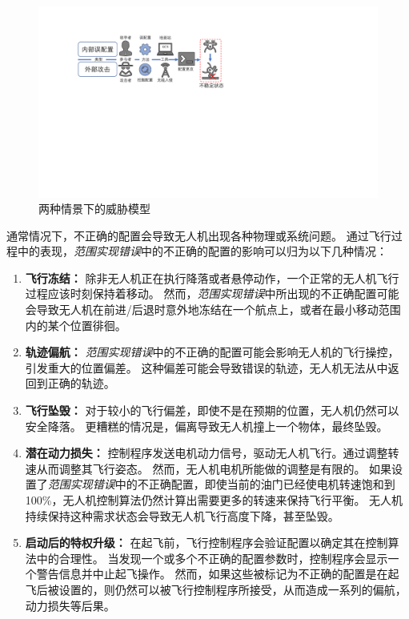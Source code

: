 \begin{figure}[ht]
  \centering
    \includegraphics[width=0.9\columnwidth]{fig/background/attack.pdf}
\caption{两种情景下的威胁模型}
\label{fig:range_attack}  
\end{figure}


通常情况下，不正确的配置会导致无人机出现各种物理或系统问题。
通过飞行过程中的表现，\textit{范围实现错误}中的不正确的配置的影响可以归为以下几种情况：
\begin{enumerate}
    \item \textbf{飞行冻结：} 除非无人机正在执行降落或者悬停动作，一个正常的无人机飞行过程应该时刻保持着移动。
    然而，\textit{范围实现错误}中所出现的不正确配置可能会导致无人机在前进/后退时意外地冻结在一个航点上，或者在最小移动范围内的某个位置徘徊。
    
    \item \textbf{轨迹偏航：} \textit{范围实现错误}中的不正确的配置可能会影响无人机的飞行操控，引发重大的位置偏差。  
    这种偏差可能会导致错误的轨迹，无人机无法从中返回到正确的轨迹。
    
    \item \textbf{飞行坠毁：} 对于较小的飞行偏差，即使不是在预期的位置，无人机仍然可以安全降落。
    更糟糕的情况是，偏离导致无人机撞上一个物体，最终坠毁。

    \item \textbf{潜在动力损失：} 控制程序发送电机动力信号，驱动无人机飞行。通过调整转速从而调整其飞行姿态。
    然而，无人机电机所能做的调整是有限的。
    如果设置了\textit{范围实现错误}中的不正确配置，即使当前的油门已经使电机转速饱和到100\%，无人机控制算法仍然计算出需要更多的转速来保持飞行平衡。
    无人机持续保持这种需求状态会导致无人机飞行高度下降，甚至坠毁。

    \item \textbf{启动后的特权升级：} 在起飞前，飞行控制程序会验证配置以确定其在控制算法中的合理性。
    当发现一个或多个不正确的配置参数时，控制程序会显示一个警告信息并中止起飞操作。
    然而，如果这些被标记为不正确的配置是在起飞后被设置的，则仍然可以被飞行控制程序所接受，从而造成一系列的偏航，动力损失等后果。
\end{enumerate}

